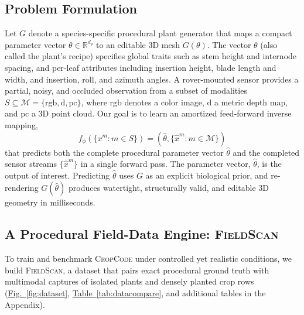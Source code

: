 \documentclass[10pt,twocolumn,letterpaper]{article}
\newcommand{\figref}[1]{\hyperref[#1]{Fig.~\ref*{#1}}}
\newcommand{\tabref}[1]{\hyperref[#1]{Table~\ref*{#1}}}
\newcommand{\appendixref}[1]{\hyperref[#1]{Appendix~\ref*{#1}}}
\newcommand{\method}{\textup{\textsc{CropCode}}}   %
\newcommand{\dataset}{\textup{\textsc{FieldScan}}}
\providecommand{\R}{\mathbb{R}}
\begin{document}
\subsection{Problem Formulation}
\label{sec:method-form}

Let $G$ denote a species-specific procedural plant generator that maps a compact parameter vector $\theta \in \R^{d_\theta}$ to an editable 3D mesh $G(\theta)$. The vector $\theta$ (also called the plant's recipe) specifies global traits such as stem height and internode spacing, and per-leaf attributes including insertion height, blade length and width, and insertion, roll, and azimuth angles. A rover-mounted sensor provides a partial, noisy, and occluded observation from a subset of modalities $S \subseteq \mathcal{M} = \{\mathrm{rgb}, \mathrm{d}, \mathrm{pc}\}$, where $\mathrm{rgb}$ denotes a color image, $\mathrm{d}$ a metric depth map, and $\mathrm{pc}$ a 3D point cloud. Our goal is to learn an amortized feed-forward inverse mapping,
\begin{equation}
  f_\phi\!\left(\{x^m : m \in S\}\right)
  = \left(\hat\theta, \{\hat x^m : m \in \mathcal{M}\}\right)
  \label{eq:procedural-inverse}
\end{equation}
that predicts both the complete procedural parameter vector $\hat\theta$ and the completed sensor streams $\{\hat x^m\}$ in a single forward pass. The parameter vector, $\hat\theta$, is the output of interest. Predicting $\hat\theta$ uses $G$ as an explicit biological prior, and re-rendering $G(\hat\theta)$ produces watertight, structurally valid, and editable 3D geometry in milliseconds.

\subsection{A Procedural Field-Data Engine: \dataset{}}
\label{sec:method-data}

To train and benchmark \method{} under controlled yet realistic conditions, we build \dataset{}, a dataset that pairs exact procedural ground truth with multimodal captures of isolated plants and densely planted crop rows (\figref{fig:dataset}, \tabref{tab:datacompare}, and additional tables in the Appendix).
\end{document}
